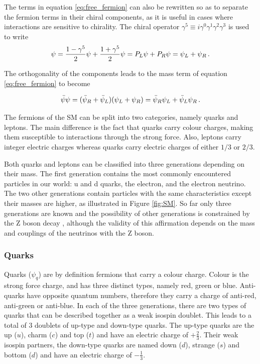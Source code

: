 The terms in equation \ref{eq:free_fermion} can also be rewritten so as to separate the fermion terms in their chiral components, as it is useful in cases where interactions are sensitive to chirality. The chiral operator $\gamma^5 \equiv i\gamma^0 \gamma^1 \gamma^2 \gamma^3$ is used to write
\begin{equation}
    \psi = \frac{1- \gamma^5}{2}\psi + \frac{1+ \gamma^5}{2}\psi = P_L \psi + P_R \psi = \psi_L + \psi_R \mend
\end{equation}

The orthogonality of the components leads to the mass term of equation \ref{eq:free_fermion} to become

\begin{equation}
    \Bar{\psi}\psi = (\Bar{\psi}_R + \Bar{\psi}_L)(\psi_L + \psi_R) = \Bar{\psi}_R \psi_L + \Bar{\psi}_L \psi_R \mend
    \label{eq:chiral_fermions}
\end{equation}

The fermions of the SM can be split into two categories, namely quarks and leptons. The main difference is the fact that quarks carry colour charges, making them susceptible to interactions through the strong force. Also, leptons carry integer electric charges whereas quarks carry electric charges of either $1/3$ or $2/3$.\newline

Both quarks and leptons can be classified into three generations depending on their mass. The first generation contains the most commonly encountered particles in our world: u and d quarks, the electron, and the electron neutrino. The two other generations contain particles with the same characteristics except their masses are higher, as illustrated in Figure \ref{fig:SM}. So far only three generations are known and the possibility of other generations is constrained by the Z boson decay \cite{2006257}, although the validity of this affirmation depends on the mass and couplings of the neutrinos with the Z boson.

\subsubsection{Quarks}

Quarks ($\psi_q$) are by definition fermions that carry a colour charge. Colour is the strong force charge, and has three distinct types, namely red, green or blue. Anti-quarks have opposite quantum numbers, therefore they carry a charge of anti-red, anti-green or anti-blue. In each of the three generations, there are two types of quarks that can be described together as a weak isospin doublet. This leads to a total of 3 doublets of up-type and down-type quarks. The up-type quarks are the up ($u$), charm ($c$) and top ($t$) and have an electric charge of $+\frac{2}{3}$. Their weak isospin partners, the down-type quarks are named down ($d$), strange ($s$) and bottom ($d$) and have an electric charge of $-\frac{1}{3}$.\newline

